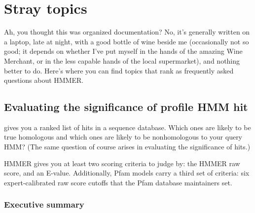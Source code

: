 \section{Stray topics}

Ah, you thought this was organized documentation? No, it's generally
written on a laptop, late at night, with a good bottle of wine beside
me (occasionally not so good; it depends on whether I've put myself in
the hands of the amazing Wine Merchant, or in the less capable hands
of the local supermarket), and nothing better to do. Here's where you
can find topics that rank as frequently asked questions about HMMER.

\subsection{Evaluating the significance of profile HMM hit}

 gives you a ranked list of hits in a sequence
database.  Which ones are likely to be true homologous and which ones
are likely to be nonhomologous to your query HMM? (The same
question of course arises in evaluating the significance of
 hits.)

HMMER gives you at least two scoring criteria to judge by: the HMMER
raw score, and an E-value. Additionally, Pfam models carry a third set
of criteria: six expert-calibrated raw score cutoffs that the Pfam
database maintainers set.

\subsubsection{Executive summary}

